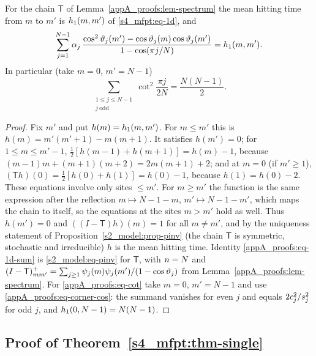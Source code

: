 \begin{lemma}\label{appA_proofs:lem-1d}
For the chain $\mathsf T$ of Lemma~\ref{appA_proofs:lem-spectrum} the mean hitting time from $m$ to $m'$ is
$h_{1}(m,m')$ of \eqref{s4_mfpt:eq-1d}, and
\begin{equation}\label{appA_proofs:eq-1d-sum}
  \sum_{j=1}^{N-1}\alpha_{j}\,\frac{\cos^{2}\vartheta_{j}(m')-\cos\vartheta_{j}(m)\cos\vartheta_{j}(m')}{1-\cos(\pi j/N)}=h_{1}(m,m').
\end{equation}
In particular (take $m=0$, $m'=N-1$)
\begin{equation}\label{appA_proofs:eq-cot}
  \sum_{\substack{1\le j\le N-1\\ j\ \mathrm{odd}}}\cot^{2}\frac{\pi j}{2N}=\frac{N(N-1)}{2}.
\end{equation}
\end{lemma}

\begin{proof}
Fix $m'$ and put $h(m)=h_{1}(m,m')$. For $m\le m'$ this is $h(m)=m'(m'+1)-m(m+1)$. It satisfies $h(m')=0$; for
$1\le m\le m'-1$, $\tfrac12[h(m-1)+h(m+1)]=h(m)-1$, because $(m-1)m+(m+1)(m+2)=2m(m+1)+2$; and at $m=0$ (if
$m'\ge1$), $(\mathsf Th)(0)=\tfrac12[h(0)+h(1)]=h(0)-1$, because $h(1)=h(0)-2$. These equations involve only sites
$\le m'$. For $m\ge m'$ the function is the same expression after the reflection $m\mapsto N-1-m$,
$m'\mapsto N-1-m'$, which maps the chain to itself, so the equations at the sites $m>m'$ hold as well. Thus
$h(m')=0$ and $((I-\mathsf T)h)(m)=1$ for all $m\ne m'$, and by the uniqueness statement of
Proposition~\ref{s2_model:prop-pinv} (the chain $\mathsf T$ is symmetric, stochastic and irreducible) $h$ is the
mean hitting time. Identity \eqref{appA_proofs:eq-1d-sum} is \eqref{s2_model:eq-pinv} for $\mathsf T$, with
$n=N$ and $(I-\mathsf T)^{+}_{mm'}=\sum_{j\ge1}\psi_j(m)\psi_j(m')/(1-\cos\vartheta_{j})$ from
Lemma~\ref{appA_proofs:lem-spectrum}. For \eqref{appA_proofs:eq-cot} take $m=0$, $m'=N-1$ and use
\eqref{appA_proofs:eq-corner-cos}: the summand vanishes for even $j$ and equals $2c_{j}^{2}/s_{j}^{2}$ for odd
$j$, and $h_{1}(0,N-1)=N(N-1)$.
\end{proof}

\subsection{Proof of Theorem~\ref{s4_mfpt:thm-single}}

